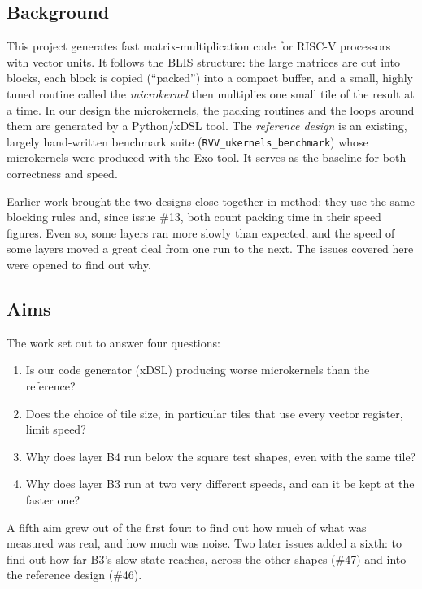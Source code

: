 \documentclass[11pt,a4paper]{article}
\begin{document}
\subsection{Background}
This project generates fast matrix-multiplication code for RISC-V processors with vector units. It follows the
BLIS structure: the large matrices are cut into blocks, each block is copied (``packed'') into a compact buffer,
and a small, highly tuned routine called the \emph{microkernel} then multiplies one small tile of the result at
a time. In our design the microkernels, the packing routines and the loops around them are generated by a
Python/xDSL tool. The \emph{reference design} is an existing, largely hand-written benchmark suite
(\texttt{RVV\_ukernels\_benchmark}) whose microkernels were produced with the Exo tool. It serves as the
baseline for both correctness and speed.

Earlier work brought the two designs close together in method: they use the same blocking rules and, since issue
\#13, both count packing time in their speed figures. Even so, some layers ran more slowly than expected, and
the speed of some layers moved a great deal from one run to the next. The issues covered here were opened to
find out why.

\subsection{Aims}
The work set out to answer four questions:
\begin{enumerate}
  \item Is our code generator (xDSL) producing worse microkernels than the reference?
  \item Does the choice of tile size, in particular tiles that use every vector register, limit speed?
  \item Why does layer B4 run below the square test shapes, even with the same tile?
  \item Why does layer B3 run at two very different speeds, and can it be kept at the faster one?
\end{enumerate}
A fifth aim grew out of the first four: to find out how much of what was measured was real, and how much was
noise. Two later issues added a sixth: to find out how far B3's slow state reaches, across the other shapes (\#47)
and into the reference design (\#46).
\end{document}
